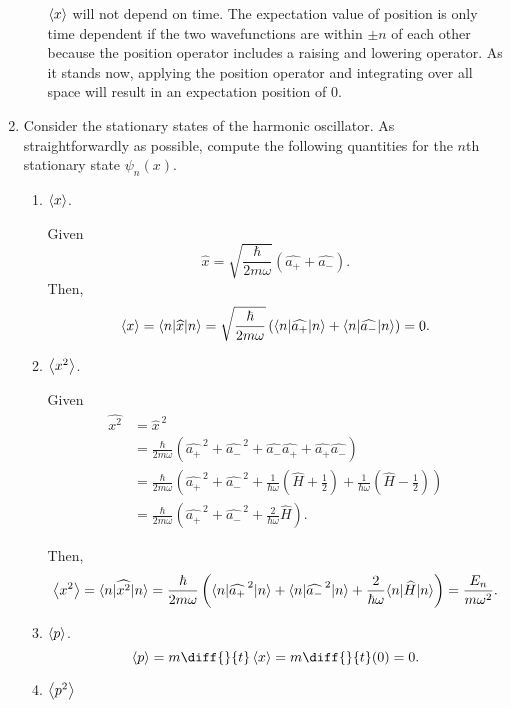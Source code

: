 \documentclass[a4paper, 12pt]{config/homework}
\begin{document}
\begin{enumerate}
\begin{enumerate}[label=(\alph*)]
\(\left\langle x \right\rangle\) will not depend on time. The expectation value of position is only time dependent if the two wavefunctions are within \(\pm n\) of each other because the position operator includes a raising and lowering operator. As it stands now, applying the position operator and integrating over all space will result in an expectation position of 0.

\end{enumerate}

\pagebreak
\item Consider the stationary states of the harmonic oscillator. As straightforwardly as possible, compute the following quantities for the \(n\)th stationary state \(\psi_n(x)\).
\begin{enumerate}[label=(\alph*)]
\item \(\left\langle x \right\rangle\).

Given
\[\widehat{x} = \sqrt{\frac{\hbar}{2m\omega}}\left(\widehat{a_+} + \widehat{a_-}\right).\]
Then,
\[\expval{x}
= \bra*{n}\widehat{x}\ket*{n}
= \sqrt{\frac{\hbar}{2m\omega}}\left(\bra*{n}\widehat{a_+}\ket*{n} + \bra*{n}\widehat{a_-}\ket*{n}\right)
= 0.\]

\item \(\left\langle x^2 \right\rangle\).

Given
\begin{align*}
\widehat{x^2} &= \widehat{x}^{\,2}
\\&= \frac{\hbar}{2m\omega} \left(\widehat{a_+}^{\,2} + \widehat{a_-}^{\,2} + \widehat{a_-}\widehat{a_+} + \widehat{a_+}\widehat{a_-}\right)
\\&= \frac{\hbar}{2m\omega} \left(\widehat{a_+}^{\,2} + \widehat{a_-}^{\,2} + \frac{1}{\hbar \omega}\left(\widehat{H}+\frac{1}{2}\right) + \frac{1}{\hbar \omega}\left(\widehat{H}-\frac{1}{2}\right)\right)
\\&= \frac{\hbar}{2m\omega} \left(\widehat{a_+}^{\,2} + \widehat{a_-}^{\,2} + \frac{2}{\hbar \omega}\widehat{H}\right).
\end{align*}

Then,
\[\expval{x^2} = \bra*{n}\widehat{x^2}\ket*{n} = \frac{\hbar}{2m\omega} \left( \bra*{n}\widehat{a_+}^{\,2}\ket*{n} + \bra*{n}\widehat{a_-}^{\,2}\ket*{n} + \frac{2}{\hbar \omega}\bra*{n}\widehat{H}\ket*{n}\right) = \frac{E_n}{m\omega^2}.\]

\item \(\left\langle p \right\rangle\).
\[\expval{p} = m\diff{}{t}\expval{x} = m\diff{}{t}(0) = 0.\]

\item \(\left\langle p^2 \right\rangle\)


\end{enumerate}
\end{enumerate}
\end{document}
